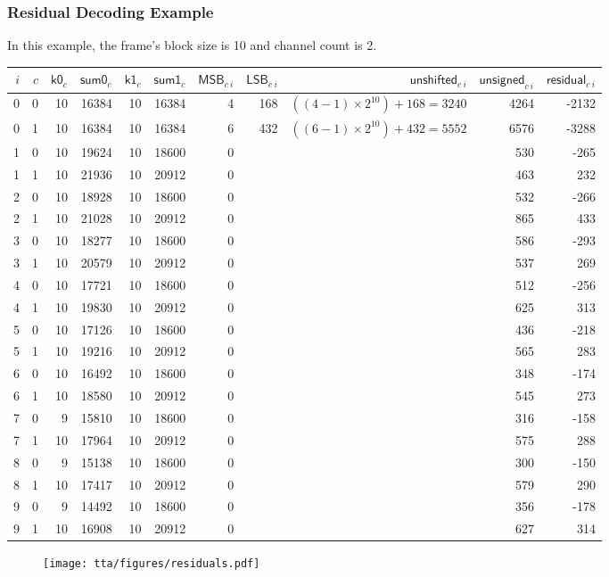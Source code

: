 \subsubsection{Residual Decoding Example}
In this example, the frame's \textsf{block size} is 10 and
channel count is 2.
\begin{table}[h]
  {
    \begin{tabular}{rrrrrrrrrrr}
      $i$ & $c$ & $\textsf{k0}_c$ & $\textsf{sum0}_c$ & $\textsf{k1}_c$ & $\textsf{sum1}_c$ & $\textsf{MSB}_{c~i}$ & $\textsf{LSB}_{c~i}$ & $\textsf{unshifted}_{c~i}$ & $\textsf{unsigned}_{c~i}$ & $\textsf{residual}_{c~i}$ \\
      \hline
0 & 0 & 10 & 16384 & 10 & 16384 & 4 &
168 & $((4 - 1) \times 2 ^ {10}) + 168 = 3240$ & 4264 &
-2132
\\
0 & 1 & 10 & 16384 & 10 & 16384 & 6 &
432 & $((6 - 1) \times 2 ^ {10}) + 432 = 5552$ & 6576 &
-3288
\\
1 & 0 & 10 & 19624 & 10 & 18600 & 0 &
 & & 530 &
-265
\\
1 & 1 & 10 & 21936 & 10 & 20912 & 0 &
 & & 463 &
232
\\
2 & 0 & 10 & 18928 & 10 & 18600 & 0 &
 & & 532 &
-266
\\
2 & 1 & 10 & 21028 & 10 & 20912 & 0 &
 & & 865 &
433
\\
3 & 0 & 10 & 18277 & 10 & 18600 & 0 &
 & & 586 &
-293
\\
3 & 1 & 10 & 20579 & 10 & 20912 & 0 &
 & & 537 &
269
\\
4 & 0 & 10 & 17721 & 10 & 18600 & 0 &
 & & 512 &
-256
\\
4 & 1 & 10 & 19830 & 10 & 20912 & 0 &
 & & 625 &
313
\\
5 & 0 & 10 & 17126 & 10 & 18600 & 0 &
 & & 436 &
-218
\\
5 & 1 & 10 & 19216 & 10 & 20912 & 0 &
 & & 565 &
283
\\
6 & 0 & 10 & 16492 & 10 & 18600 & 0 &
 & & 348 &
-174
\\
6 & 1 & 10 & 18580 & 10 & 20912 & 0 &
 & & 545 &
273
\\
7 & 0 & 9 & 15810 & 10 & 18600 & 0 &
 & & 316 &
-158
\\
7 & 1 & 10 & 17964 & 10 & 20912 & 0 &
 & & 575 &
288
\\
8 & 0 & 9 & 15138 & 10 & 18600 & 0 &
 & & 300 &
-150
\\
8 & 1 & 10 & 17417 & 10 & 20912 & 0 &
 & & 579 &
290
\\
9 & 0 & 9 & 14492 & 10 & 18600 & 0 &
 & & 356 &
-178
\\
9 & 1 & 10 & 16908 & 10 & 20912 & 0 &
 & & 627 &
314
\\
    \end{tabular}
  }
\end{table}
\begin{figure}[h]
  \texttt{[image: tta/figures/residuals.pdf]}
\end{figure}


